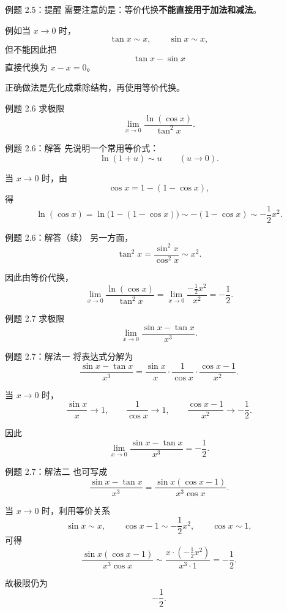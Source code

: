 ﻿\documentclass[aspectratio=169,11pt]{ctexbeamer}
\begin{document}
\begin{frame}{例题 2.5：提醒}
需要注意的是：等价代换\textbf{不能直接用于加法和减法}。

\vspace{0.8em}
例如当 $x\to 0$ 时，
\[
  \tan x\sim x,\qquad \sin x\sim x,
\]
但不能因此把
\[
  \tan x-\sin x
\]
直接代换为 $x-x=0$。

\vspace{0.8em}
正确做法是先化成乘除结构，再使用等价代换。
\end{frame}

\begin{frame}{例题 2.6}
求极限
\[
  \lim_{x\to 0}\frac{\ln(\cos x)}{\tan^2 x}.
\]
\end{frame}

\begin{frame}{例题 2.6：解答}
先说明一个常用等价式：
\[
  \ln(1+u)\sim u\qquad (u\to 0).
\]

当 $x\to 0$ 时，由
\[
  \cos x=1-(1-\cos x),
\]
得
\[
  \ln(\cos x)=\ln\bigl(1-(1-\cos x)\bigr)\sim -(1-\cos x)\sim -\frac12x^2.
\]
\end{frame}

\begin{frame}{例题 2.6：解答（续）}
另一方面，
\[
  \tan^2x=\frac{\sin^2x}{\cos^2x}\sim x^2.
\]

因此由等价代换，
\[
  \lim_{x\to 0}\frac{\ln(\cos x)}{\tan^2 x}
  =
  \lim_{x\to 0}\frac{-\frac12x^2}{x^2}
  =
  -\frac12.
\]
\end{frame}

\begin{frame}{例题 2.7}
求极限
\[
  \lim_{x\to 0}\frac{\sin x-\tan x}{x^3}.
\]
\end{frame}

\begin{frame}{例题 2.7：解法一}
将表达式分解为
\[
  \frac{\sin x-\tan x}{x^3}
  =
  \frac{\sin x}{x}\cdot \frac{1}{\cos x}\cdot \frac{\cos x-1}{x^2}.
\]

当 $x\to 0$ 时，
\[
  \frac{\sin x}{x}\to 1,\qquad \frac{1}{\cos x}\to 1,\qquad \frac{\cos x-1}{x^2}\to -\frac12.
\]

因此
\[
  \lim_{x\to 0}\frac{\sin x-\tan x}{x^3}=-\frac12.
\]
\end{frame}

\begin{frame}{例题 2.7：解法二}
也可写成
\[
  \frac{\sin x-\tan x}{x^3}
  =
  \frac{\sin x(\cos x-1)}{x^3\cos x}.
\]

当 $x\to 0$ 时，利用等价关系
\[
  \sin x\sim x,\qquad \cos x-1\sim -\frac12x^2,\qquad \cos x\sim 1,
\]
可得
\[
  \frac{\sin x(\cos x-1)}{x^3\cos x}
  \sim
  \frac{x\cdot\left(-\frac12x^2\right)}{x^3\cdot 1}
  =
  -\frac12.
\]

故极限仍为
\[
  -\frac12.
\]
\end{frame}
\end{document}
